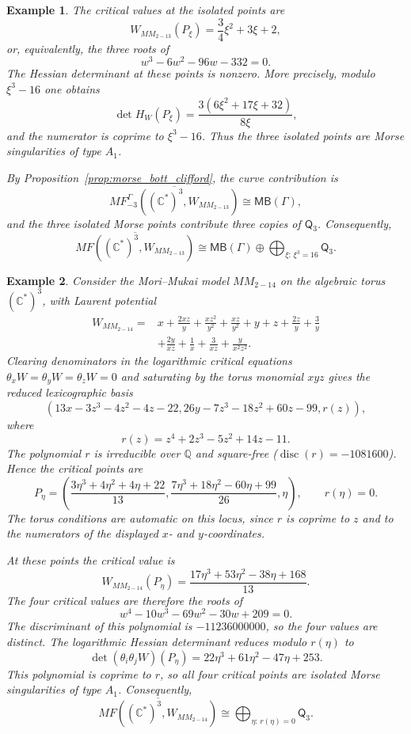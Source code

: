 \documentclass[11pt]{amsart}
\newtheorem{example}{Example}[section]
\newcommand{\MorseCat}[1]{\mathsf{Q}_{#1}}
\newcommand{\MBcat}[1]{\mathsf{MB}(#1)}
\begin{document}
\begin{example}
The critical values at the isolated points are
\[
W_{MM_{2-13}}(P_{\xi})=\frac{3}{4}\xi^2+3\xi+2,
\]
or, equivalently, the three roots of
\[
w^3-6w^2-96w-332=0.
\]
The Hessian determinant at these points is nonzero. More precisely, modulo
$\xi^3-16$ one obtains
\[
\det H_W(P_{\xi})=
\frac{3(6\xi^2+17\xi+32)}{8\xi},
\]
and the numerator is coprime to $\xi^3-16$. Thus the three isolated points are
Morse singularities of type $A_1$.

By Proposition~\ref{prop:morse_bott_clifford}, the curve contribution is
\[
\overline{MF^{\Gamma}_{-3}((\mathbb{C}^*)^3,W_{MM_{2-13}})}
\cong \MBcat{\Gamma},
\]
and the three isolated Morse points contribute three copies of
$\MorseCat{3}$. Consequently,
\[
\overline{MF((\mathbb{C}^*)^3,W_{MM_{2-13}})}
\cong \MBcat{\Gamma}\oplus \bigoplus_{\xi:\,\xi^3=16}\MorseCat{3}.
\]
\end{example}

\begin{example}
Consider the Mori--Mukai model $MM_{2-14}$ on the algebraic torus
$(\mathbb{C}^*)^3$, with Laurent potential
\begin{align*}
W_{MM_{2-14}}={}&x+\frac{2xz}{y}+\frac{xz^2}{y^2}
+\frac{xz}{y^2}+y+z+\frac{2z}{y}+\frac{3}{y} \\
&+\frac{2y}{xz}+\frac{1}{x}+\frac{3}{xz}
+\frac{y}{x^2z^2}.
\end{align*}
Clearing denominators in the logarithmic critical equations
$\theta_xW=\theta_yW=\theta_zW=0$ and saturating by the torus monomial $xyz$
gives the reduced lexicographic basis
\[
\left(
13x-3z^3-4z^2-4z-22,
26y-7z^3-18z^2+60z-99,
r(z)
\right),
\]
where
\[
r(z)=z^4+2z^3-5z^2+14z-11.
\]
The polynomial $r$ is irreducible over $\mathbb{Q}$ and square-free
($\operatorname{disc}(r)=-1081600$). Hence the critical points are
\[
P_{\eta}=\left(
\frac{3\eta^3+4\eta^2+4\eta+22}{13},
\frac{7\eta^3+18\eta^2-60\eta+99}{26},
\eta
\right),
\qquad
r(\eta)=0.
\]
The torus conditions are automatic on this locus, since $r$ is coprime to
$z$ and to the numerators of the displayed $x$- and $y$-coordinates.

At these points the critical value is
\[
W_{MM_{2-14}}(P_{\eta})
=\frac{17\eta^3+53\eta^2-38\eta+168}{13}.
\]
The four critical values are therefore the roots of
\[
w^4-10w^3-69w^2-30w+209=0.
\]
The discriminant of this polynomial is $-11236000000$, so the four values are
distinct. The logarithmic Hessian determinant reduces modulo $r(\eta)$ to
\[
\det(\theta_i\theta_jW)(P_{\eta})
=22\eta^3+61\eta^2-47\eta+253.
\]
This polynomial is coprime to $r$, so all four critical points are isolated
Morse singularities of type $A_1$.
Consequently,
\[
\overline{MF((\mathbb{C}^*)^3,W_{MM_{2-14}})}
\cong \bigoplus_{\eta:\,r(\eta)=0}\MorseCat{3}.
\]
\end{example}
\end{document}
